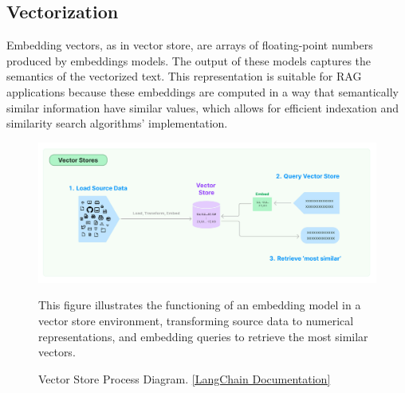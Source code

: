 \subsection{Vectorization}
Embedding vectors, as in vector store, are arrays of floating-point numbers produced by embeddings models. The output of these models captures the semantics of the vectorized text. This representation is suitable for RAG applications because these embeddings are computed in a way that semantically similar information have similar values, which allows for efficient indexation and similarity search algorithms' implementation.
\begin{figure}[H]
    \centering
    \includegraphics[width=\linewidth]{./figures/vectorstore.jpg}
    \caption{Vector Store Process Diagram. \href{https://python.langchain.com/v0.1/docs/modules/data_connection/vectorstores/}{[LangChain Documentation]}}
    \begin{flushleft}
        \small This figure illustrates the functioning of an embedding model in a vector store environment, transforming source data to numerical representations, and embedding queries to retrieve the most similar vectors.
    \end{flushleft}
\end{figure}
